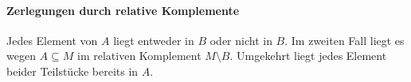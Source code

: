\documentclass[main.tex]{subfiles}
\begin{document}
\begin{tabproofwide}
    {}
    {}
\end{tabproofwide}

\paragraph{Zerlegungen durch relative Komplemente}

Jedes Element von \(A\) liegt entweder in \(B\) oder nicht in \(B\).
Im zweiten Fall liegt es wegen \(A\subseteq M\) im relativen Komplement
\(M\setminus B\). Umgekehrt liegt jedes Element beider Teilstücke
bereits in \(A\).
\end{document}
